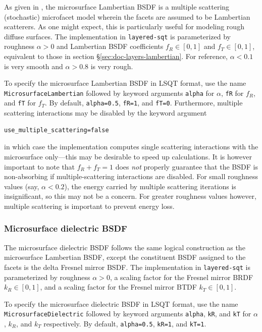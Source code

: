 \documentclass[
    twoside,
    twocolumn,
    letterpaper,
    10pt]{article}
\newcommand\namett[2]{{\color{code#1}\texttt{#2}}}
\begin{document}
As given in \cite{Heitz:16},
the microsurface Lambertian BSDF is a multiple scattering (stochastic)
microfacet model wherein the facets are assumed to be Lambertian scatterers.
As one might expect, this is particularly useful for modeling rough diffuse 
surfaces. The implementation in \texttt{layered-sqt} is parameterized by
roughness $\alpha>0$ and Lambertian BSDF coefficients
$f_R \in [0,1]$ and $f_T \in [0,1]$, equivalent to those in section
\S\ref{sec:doc-layers-lambertian}.
For reference, $\alpha < 0.1$ is very smooth and
$\alpha > 0.8$ is very rough.

To specify the microsurface Lambertian BSDF 
in LSQT format, use the name \namett{purple}{MicrosurfaceLambertian}
followed by keyword arguments \texttt{alpha} for $\alpha$,
\texttt{fR} for $f_R$, and \texttt{fT} for $f_T$. By default, 
\texttt{alpha=0.5}, \texttt{fR=1}, and \texttt{fT=0}. 
Furthermore, multiple scattering interactions may be disabled by the 
keyword argument
\begin{lstlisting}
use_multiple_scattering=false
\end{lstlisting}
in which case the implementation computes single 
scattering interactions with the microsurface only---this may be
desirable to speed up calculations. It is however important to note that
$f_R + f_T = 1$ does \emph{not} properly guarantee that the BSDF is 
non-absorbing
if multiple-scattering interactions are disabled. 
For small roughness values (say, $\alpha < 0.2$), the energy carried by 
multiple scattering iterations is insignificant, so this may not be a
concern. For greater roughness values however, multiple scattering is important
to prevent energy loss.

\subsubsection{Microsurface dielectric BSDF}
\label{sec:doc-layers-microsurface-dielectric}

The microsurface dielectric BSDF follows the same logical construction as 
the microsurface Lambertian BSDF, except the constituent BSDF assigned to the
facets is the delta Fresnel mirror BSDF. The implementation in 
\texttt{layered-sqt} is parameterized by roughness $\alpha > 0$, a scaling
factor for the Fresnel mirror BRDF $k_R \in [0, 1]$, and a scaling factor for 
the Fresnel mirror BTDF $k_T \in [0, 1]$.

To specify the microsurface dielectric BSDF 
in LSQT format, use the name
\namett{purple}{MicrosurfaceDielectric}
followed by keyword arguments \texttt{alpha}, \texttt{kR}, and
\texttt{kT} for $\alpha$, $k_R$, and $k_T$ respectively. By default, 
\texttt{alpha=0.5}, \texttt{kR=1}, and \texttt{kT=1}.
\end{document}
